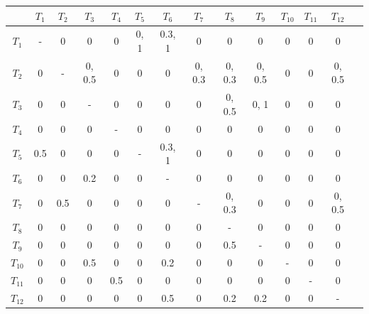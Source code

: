 \documentclass[letterpaper]{article}
\begin{document}
    \begin{table}[h!]
      \centering
      \small
      \begin{tabular}{c|ccccccccccccc}
        & $T_1$ & $T_2$ & $T_3$ & $T_4$ & $T_5$ & $T_6$ & $T_7$ & $T_8$ & $T_9$ & $T_{10}$ & $T_{11}$ & $T_{12}$ \\
        \hline
        $T_1$       & -     & 0     & 0         & 0     & 0, 1  & 0.3, 1    & 0         & 0         & 0         & 0     & 0     & 0         \\
        $T_2$       & 0     & -     & 0, 0.5    & 0     & 0     & 0         & 0, 0.3    & 0, 0.3    & 0, 0.5    & 0     & 0     & 0, 0.5    \\
        $T_3$       & 0     & 0     & -         & 0     & 0     & 0         & 0         & 0, 0.5    & 0, 1      & 0     & 0     & 0         \\
        $T_4$       & 0     & 0     & 0         & -     & 0     & 0         & 0         & 0         & 0         & 0     & 0     & 0         \\
        $T_5$       & 0.5   & 0     & 0         & 0     & -     & 0.3, 1    & 0         & 0         & 0         & 0     & 0     & 0         \\
        $T_6$       & 0     & 0     & 0.2       & 0     & 0     & -         & 0         & 0         & 0         & 0     & 0     & 0         \\
        $T_7$       & 0     & 0.5   & 0         & 0     & 0     & 0         & -         & 0, 0.3    & 0         & 0     & 0     & 0, 0.5    \\
        $T_8$       & 0     & 0     & 0         & 0     & 0     & 0         & 0         & -         & 0         & 0     & 0     & 0         \\
        $T_9$       & 0     & 0     & 0         & 0     & 0     & 0         & 0         & 0.5       & -         & 0     & 0     & 0         \\
        $T_{10}$    & 0     & 0     & 0.5       & 0     & 0     & 0.2       & 0         & 0         & 0         & -     & 0     & 0         \\
        $T_{11}$    & 0     & 0     & 0         & 0.5   & 0     & 0         & 0         & 0         & 0         & 0     & -     & 0         \\
        $T_{12}$    & 0     & 0     & 0         & 0     & 0     & 0.5       & 0         & 0.2       & 0.2       & 0     & 0     & -         \\
      \end{tabular}
    \end{table}
\end{document}
